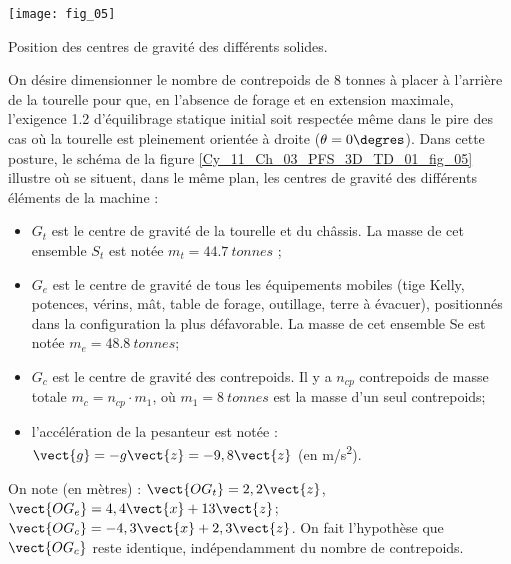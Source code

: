 

\begin{marginfigure}
\centering
\texttt{[image: fig\_05]}
\caption{ Position des centres 
de gravité des différents solides. \label{Cy_11_Ch_03_PFS_3D_TD_01_fig_05}}
\end{marginfigure}

On désire dimensionner le nombre de contrepoids de 8 tonnes à 
placer à l’arrière de la tourelle pour que, en l’absence de forage 
et en extension maximale, l’exigence 1.2 d’équilibrage statique 
initial soit respectée même dans le pire des cas où la tourelle est 
pleinement orientée à droite ($\theta=0\degres$). Dans cette posture, le 
schéma de la figure \ref{Cy_11_Ch_03_PFS_3D_TD_01_fig_05} illustre où se situent, dans le même plan, 
les centres de gravité des différents éléments de la machine :  
\begin{itemize}
\item $G_t$ est le centre de gravité de la tourelle et du châssis. La 
masse de cet ensemble $S_t$ est notée $m_t = \SI{44,7}{tonnes}$ ; 
\item $G_e$ est le centre de gravité de tous les équipements mobiles 
(tige Kelly, potences, vérins, mât, table de forage, outillage, 
terre à évacuer), positionnés dans la configuration la plus 
défavorable. La masse de cet ensemble Se est notée 
$m_e = \SI{48,8}{tonnes}$; 
\item $G_c$ est le centre de gravité des contrepoids. Il y a $n_{cp}$ 
contrepoids de masse totale $m_c = n_{cp}\cdot m_1$, où $m_1 = \SI{8}{tonnes}$
est la masse d’un seul contrepoids; 
\item l’accélération de la pesanteur est notée : $\vect{g}=-g\vect{z}=-9,8\vect{z}$
(en \si{m/s^2}).
\end{itemize} 
On note (en mètres) : $\vect{OG_t}=2,2\vect{z}$, $\vect{OG_e}=4,4\vect{x}+13\vect{z}$; $\vect{OG_c}=-4,3\vect{x}+2,3\vect{z}$. On fait l'hypothèse que $\vect{OG_c}$ reste identique, indépendamment du nombre de contrepoids. 

